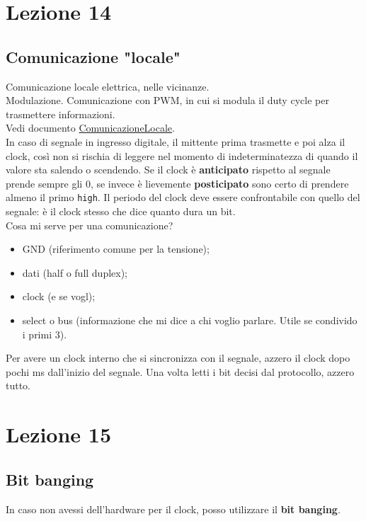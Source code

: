 \documentclass{article}
\begin{document}
\section{Lezione 14}
\subsection{Comunicazione "locale"}
Comunicazione locale elettrica, nelle vicinanze.
\\ Modulazione. Comunicazione con PWM, in cui si modula il duty cycle per trasmettere informazioni.
\\ Vedi documento \href{run:https://gitlab.di.unimi.it/sistemiembedded/2024-2025/-/blob/master/comunicazioneLocale.md?ref_type=heads}{ComunicazioneLocale}.
\\ In caso di segnale in ingresso digitale, il mittente prima trasmette e poi alza il clock, così non si rischia di leggere nel momento di indeterminatezza di quando il valore sta salendo o scendendo. Se il clock è \textbf{anticipato} rispetto al segnale prende sempre gli 0, se invece è lievemente \textbf{posticipato} sono certo di prendere almeno il primo \texttt{high}.
Il periodo del clock deve essere confrontabile con quello del segnale: è il clock stesso che dice quanto dura un bit.
\\ Cosa mi serve per una comunicazione?
\begin{itemize}
    \item GND (riferimento comune per la tensione);
    \item dati (half o full duplex);
    \item clock (e se vogl);
    \item select o bus (informazione che mi dice a chi voglio parlare. Utile se condivido i primi 3).
\end{itemize}
Per avere un clock interno che si sincronizza con il segnale, azzero il clock dopo pochi ms dall'inizio del segnale. Una volta letti i bit decisi dal protocollo, azzero tutto.
\section{Lezione 15}
\subsection{Bit banging}
In caso non avessi dell'hardware per il clock, posso utilizzare il \textbf{bit banging}.
\end{document}
